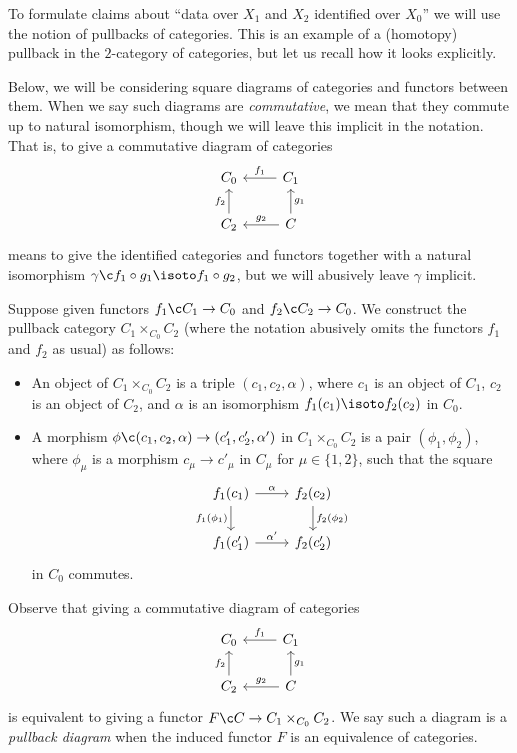 To formulate claims about ``data over $X_1$ and $X_2$ identified over $X_0$'' we will use the notion of pullbacks of categories. This is an example of a (homotopy) pullback in the $2$-category of categories, but let us recall how it looks explicitly.

\begin{convention}
  \label{vhs--pushouts--category-diagram}
  Below, we will be considering square diagrams of categories and functors between them. When we say such diagrams are \emph{commutative}, we mean that they commute up to natural isomorphism, though we will leave this implicit in the notation. That is, to give a commutative diagram of categories
  \[
    \begin{tikzcd}
      C_0  &
      C_1 \ar[l, "f_1", swap] \\
      C_2 \ar[u, "f_2"] &
      C \ar[l, "g_2", swap] \ar[u, "g_1", swap]
    \end{tikzcd}
  \]
  means to give the identified categories and functors together with a natural isomorphism $\gamma \c f_1 \circ g_1 \isoto f_1 \circ g_2$, but we will abusively leave $\gamma$ implicit.
\end{convention}

\begin{construction}
  \label{vhs--pushouts--category-pullback}
  Suppose given functors $f_1 \c C_1 \to C_0$ and $f_2 \c C_2 \to C_0$. We construct the pullback category $C_1 \times_{C_0} C_2$ (where the notation abusively omits the functors $f_1$ and $f_2$ as usual) as follows:
  \begin{itemize}
  \item An object of $C_1 \times_{C_0} C_2$ is a triple $(c_1,c_2,\alpha)$, where $c_1$ is an object of $C_1$, $c_2$ is an object of $C_2$, and $\alpha$ is an isomorphism $f_1(c_1) \isoto f_2(c_2)$ in $C_0$.
  \item A morphism $\phi \c (c_1,c_2,\alpha) \to (c'_1, c'_2, \alpha')$ in $C_1 \times_{C_0} C_2$ is a pair $(\phi_1,\phi_2)$, where $\phi_\mu$ is a morphism $c_\mu \to c'_\mu$ in $C_\mu$ for $\mu \in \{1,2\}$, such that the square
    \[
      \begin{tikzcd}
        f_1(c_1) \ar[r, "\alpha"] \ar[d, "f_1(\phi_1)", swap] &
        f_2(c_2) \ar[d, "f_2(\phi_2)"] \\
        f_1(c'_1) \ar[r, "\alpha'"] &
        f_2(c'_2)
      \end{tikzcd}
    \]
    in $C_0$ commutes.
  \end{itemize}

  Observe that giving a commutative diagram of categories
  \[
    \begin{tikzcd}
      C_0  &
      C_1 \ar[l, "f_1", swap] \\
      C_2 \ar[u, "f_2"] &
      C \ar[l, "g_2", swap] \ar[u, "g_1", swap]
    \end{tikzcd}
  \]
  is equivalent to giving a functor $F \c C \to C_1 \times_{C_0} C_2$. We say such a diagram is a \emph{pullback diagram} when the induced functor $F$ is an equivalence of categories.
\end{construction}


